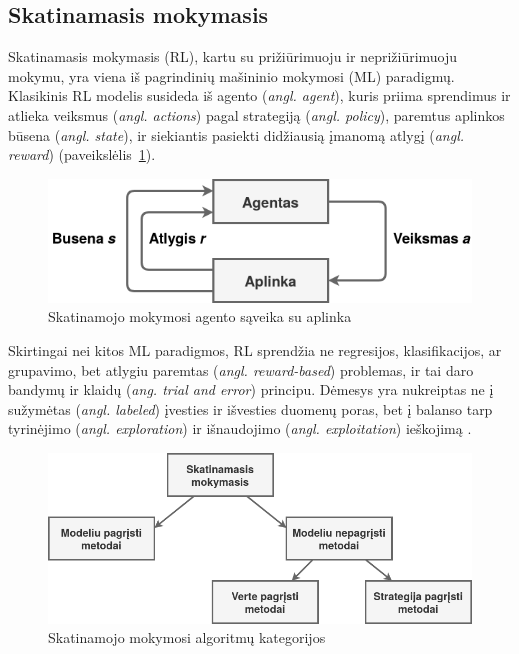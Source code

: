 \documentclass{VUMIFPSbakalaurinis}
\begin{document}
\subsection{Skatinamasis mokymasis}\label{subsec:RL} 
{
	Skatinamasis mokymasis (RL), kartu su prižiūrimuoju ir neprižiūrimuoju mokymu, yra viena iš pagrindinių mašininio mokymosi (ML) paradigmų. Klasikinis RL modelis susideda iš agento (\textit{angl. agent}), kuris priima sprendimus ir atlieka veiksmus (\textit{angl. actions}) pagal strategiją  (\textit{angl. policy}), paremtus aplinkos būsena (\textit{angl. state}), ir siekiantis pasiekti didžiausią įmanomą atlygį (\textit{angl. reward}) (paveikslėlis~\ref{img:rl}).\par
	
	\begin{figure}[H]
		\centering
		\includegraphics[scale=0.5]{img/rl}
		\caption{Skatinamojo mokymosi agento sąveika su aplinka}
		\label{img:rl}
	\end{figure} 
	
	Skirtingai nei kitos ML paradigmos, RL sprendžia ne regresijos, klasifikacijos, ar grupavimo, bet atlygiu paremtas (\textit{angl. reward-based}) problemas, ir tai daro bandymų ir klaidų (\textit{ang. trial and error}) principu. Dėmesys yra nukreiptas ne į sužymėtas (\textit{angl. labeled}) įvesties ir išvesties duomenų poras, bet į balanso tarp tyrinėjimo (\textit{angl. exploration}) ir išnaudojimo (\textit{angl. exploitation}) ieškojimą \cite{kaelbling_littman_moore}.\par
	
	\begin{figure}[H]
		\centering
		\includegraphics[scale=0.5]{img/rl_overview}
		\caption{Skatinamojo mokymosi algoritmų kategorijos}
		\label{img:rl_overview}
	\end{figure} 
	
}
\end{document}
